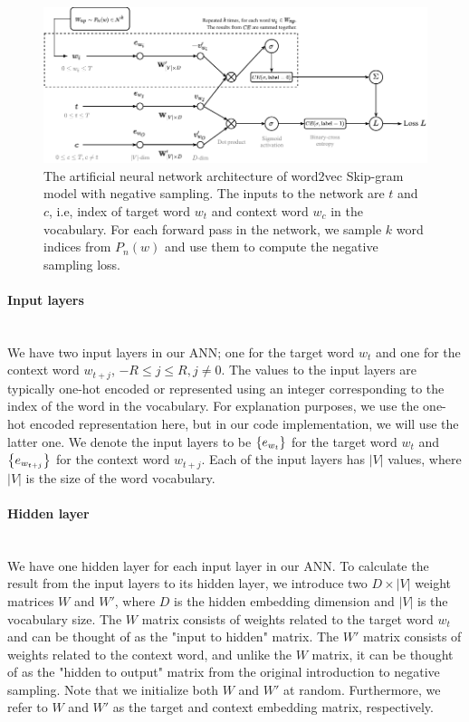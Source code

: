 \begin{figure}[ht]
    \centering
    \includegraphics[width=16cm]{thesis/figures/word2vec-sgns_cropped.pdf}
    \caption{The artificial neural network architecture of word2vec Skip-gram model with negative sampling. The inputs to the network are $t$ and $c$, i.e, index of target word $w_t$ and context word $w_c$ in the vocabulary. For each forward pass in the network, we sample $k$ word indices from $P_n(w)$ and use them to compute the negative sampling loss.}
    \label{fig:word2vec-skip-gram-negative-sampling}
\end{figure}

\paragraph*{Input layers}\mbox{} \\
We have two input layers in our ANN; one for the target word $w_t$ and one for the context word $w_{t+j}$, $-R \leq j \leq R, j \neq 0$. The values to the input layers are typically one-hot encoded or represented using an integer corresponding to the index of the word in the vocabulary. For explanation purposes, we use the one-hot encoded representation here, but in our code implementation, we will use the latter one. We denote the input layers to be $\left\{e_{w_t}\right\}$ for the target word $w_t$ and $\left\{e_{w_{t+j}}\right\}$ for the context word $w_{t+j}$. Each of the input layers has $|V|$ values, where $|V|$ is the size of the word vocabulary.

\paragraph*{Hidden layer}\mbox{} \\
We have one hidden layer for each input layer in our ANN. To calculate the result from the input layers to its hidden layer, we introduce two $D \times |V|$ weight matrices $W$ and $W'$, where $D$ is the hidden embedding dimension and $|V|$ is the vocabulary size. The $W$ matrix consists of weights related to the target word $w_t$ and can be thought of as the "input to hidden" matrix. The $W'$ matrix consists of weights related to the context word, and unlike the $W$ matrix, it can be thought of as the "hidden to output" matrix from the original introduction to negative sampling. Note that we initialize both $W$ and $W'$ at random. Furthermore, we refer to $W$ and $W'$ as the target and context embedding matrix, respectively.


